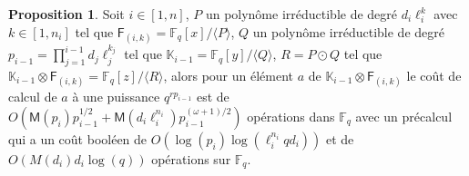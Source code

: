 \documentclass[10pt,a4paper]{book}
\theoremstyle{plain}
\theoremstyle{definition}
\theoremstyle{definition}
\theoremstyle{definition}
\newtheorem{prop}[thm]{Proposition}
\theoremstyle{definition}
\theoremstyle{remark}
\theoremstyle{remark}
\theoremstyle{definition}
\begin{document}
\begin{prop}
\label{pro:fro:com}
Soit $i \in [1,n]$, $P$ un polynôme irréductible de degré $d_i\ell_i^{k}$ avec 
$k \in [1,n_i]$ tel que $\mathsf{F}_{(i,k)}=\mathbb{F}_q[x]/\langle P \rangle$,
$Q$ un polynôme irréductible de degré $p_{i-1}=\prod_{j=1}^{i-1}d_j\ell_j^{k_j}$
tel que $\mathbb{K}_{i-1}=\mathbb{F}_q[y]/\langle Q \rangle$, $R=P \odot Q$ 
tel que  $\mathbb{K}_{i-1} \otimes \mathsf{F}_{(i,k)}=\mathbb{F}_q[z]/\langle R
\rangle$, alors pour un élément $a$ de $\mathbb{K}_{i-1} \otimes 
\mathsf{F}_{(i,k)}$ le coût de calcul de $a$ à une puissance 
$q^{r p_{i-1}}$ est de $O(\mathsf{M}(p_i)p_{i-1}^{1/2}+\mathsf{M}(d_i\ell_i^{n_i})p_{i-1}^{(\omega+1)/2})$ opérations dans $\mathbb{F}_q$ avec un 
précalcul qui a un coût booléen de $O(\log(p_{i})\log(\ell_i^{n_i}qd_i))$ et  
de $O( M(d_i) d_i\log(q))$ opérations sur $\mathbb{F}_q$.
\end{prop}
\end{document}

